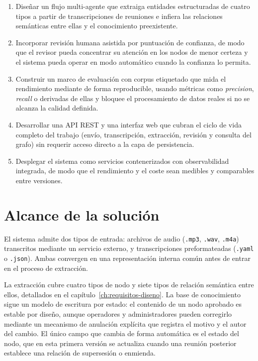 \begin{enumerate}
  \item Diseñar un flujo multi-agente que extraiga entidades estructuradas de cuatro
        tipos a partir de transcripciones de reuniones e infiera las relaciones semánticas entre
        ellas y el conocimiento preexistente.

  \item Incorporar revisión humana asistida por puntuación de confianza, de modo que el revisor
        pueda concentrar su atención en los nodos de menor certeza y el sistema pueda operar en
        modo automático cuando la confianza lo permita.

  \item Construir un marco de evaluación con corpus etiquetado que mida el rendimiento mediante
        de forma reproducible, usando métricas como \textit{precision}, \textit{recall} o derivadas
        de ellas y bloquee el procesamiento de datos reales si no se alcanza la calidad definida.

  \item Desarrollar una \ac{API} REST y una interfaz web que cubran el ciclo de vida completo del
        trabajo (envío, transcripción, extracción, revisión y consulta del grafo) sin requerir
        acceso directo a la capa de persistencia.

  \item Desplegar el sistema como servicios contenerizados con observabilidad integrada, de modo
        que el rendimiento y el coste sean medibles y comparables entre versiones.
\end{enumerate}

\section{Alcance de la solución}
\label{sec:alcance}

El sistema admite dos tipos de entrada: archivos de audio (\texttt{.mp3}, \texttt{.wav},
\texttt{.m4a}) transcritos mediante un servicio externo, y transcripciones preformateadas
(\texttt{.yaml} o \texttt{.json}). Ambas convergen en una representación interna común antes
de entrar en el proceso de extracción.

La extracción cubre cuatro tipos de nodo y siete tipos de relación semántica entre ellos,
detallados en el capítulo~\ref{ch:requisitos-diseno}. La base de conocimiento sigue un modelo
de escritura por estado: el contenido de un nodo aprobado es estable por diseño, aunque
operadores y administradores pueden corregirlo mediante un mecanismo de anulación explícita
que registra el motivo y el autor del cambio. El único campo que cambia de forma automática
es el estado del nodo, que en esta primera versión se actualiza cuando una reunión posterior
establece una relación de supersesión o enmienda.

